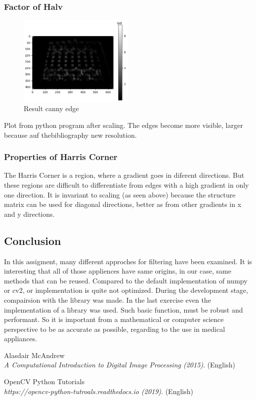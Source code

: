 \documentclass[12pt]{article}
\begin{document}
\subsubsection{Factor of Halv}
\begin{figure}[!htb]
  \centering
  \includegraphics[width=0.5\textwidth]{pics/3_4_s}
  \caption{Result canny edge}
\end{figure}
Plot from python program after scaling. The edges become more visible, larger because auf thebibliography
new resolution.

\subsubsection{Properties of Harris Corner}
The Harris Corner is a region, where a gradient goes in diferent directions. But these regions are difficult to
differentiate from edges with a high gradient in only one direction. It is invariant to scaling (as seen above)
because the structure matrix can be used for diagonal directions, better as from other gradients in x and y directions.

\newpage
\subsection{Conclusion}
In this assigment, many different approches for filtering have been examined. It is interesting that all of those appliences 
have same origins, in our case, same methods that can be reused. Compared to the default implementation of numpy or cv2, or 
implementation is quite not optimized. During the development stage, compairsion with the library was made. In the last exercise
even the implementation of a library was used. Such basic function, must be robust and performant. So it is important from a 
mathematical or computer science perspective to be as accurate as possible, regarding to the use in medical appliances.


\begin{thebibliography}{1}
  Alasdair McAndrew
  \\\textit{A Computational Introduction to Digital Image Processing (2015)}. (English)  

  OpenCV Python Tutorials
  \\\textit{https://opencv-python-tutroals.readthedocs.io (2019)}. (English)  
\end{thebibliography}
\end{document}

